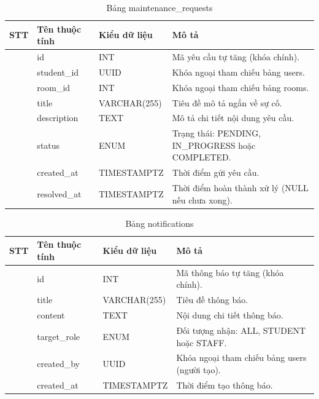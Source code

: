 \documentclass[13pt,a4paper]{extarticle}
\numberwithin{figure}{section}
\numberwithin{table}{section}
\begin{document}
	\begin{table}[H]
		\centering
		\caption{Bảng maintenance\_requests}
		\label{tab:maintenancerequests}
		\begingroup
		\setlength{\tabcolsep}{3pt}
		\begin{tabularx}{\textwidth}{|>{\centering\arraybackslash}p{1cm}|>{\raggedright\arraybackslash}p{3.8cm}|>{\raggedright\arraybackslash}p{3.2cm}|Y|}
			\hline
			\centering\textbf{STT} & \centering\textbf{Tên thuộc tính} & \centering\textbf{Kiểu dữ liệu} & \centering\arraybackslash\textbf{Mô tả} \\
			 & id & INT & Mã yêu cầu tự tăng (khóa chính). \\
			 & student\_id & UUID & Khóa ngoại tham chiếu bảng users. \\
			 & room\_id & INT & Khóa ngoại tham chiếu bảng rooms. \\
			 & title & VARCHAR(255) & Tiêu đề mô tả ngắn về sự cố. \\
			 & description & TEXT & Mô tả chi tiết nội dung yêu cầu. \\
			 & status & ENUM & Trạng thái: PENDING, IN\_PROGRESS hoặc COMPLETED. \\
			 & created\_at & TIMESTAMPTZ & Thời điểm gửi yêu cầu. \\
			 & resolved\_at & TIMESTAMPTZ & Thời điểm hoàn thành xử lý (NULL nếu chưa xong). \\
			\hline
		\end{tabularx}
		\endgroup
	\end{table}
	
	\begin{table}[H]
		\centering
		\caption{Bảng notifications}
		\label{tab:notifications}
		\begingroup
		\setlength{\tabcolsep}{3pt}
		\begin{tabularx}{\textwidth}{|>{\centering\arraybackslash}p{1cm}|>{\raggedright\arraybackslash}p{3.8cm}|>{\raggedright\arraybackslash}p{3.2cm}|Y|}
			\hline
			\centering\textbf{STT} & \centering\textbf{Tên thuộc tính} & \centering\textbf{Kiểu dữ liệu} & \centering\arraybackslash\textbf{Mô tả} \\
			 & id & INT & Mã thông báo tự tăng (khóa chính). \\
			 & title & VARCHAR(255) & Tiêu đề thông báo. \\
			 & content & TEXT & Nội dung chi tiết thông báo. \\
			 & target\_role & ENUM & Đối tượng nhận: ALL, STUDENT hoặc STAFF. \\
			 & created\_by & UUID & Khóa ngoại tham chiếu bảng users (người tạo). \\
			 & created\_at & TIMESTAMPTZ & Thời điểm tạo thông báo. \\
			\hline
		\end{tabularx}
		\endgroup
	\end{table}
	
\end{document}
